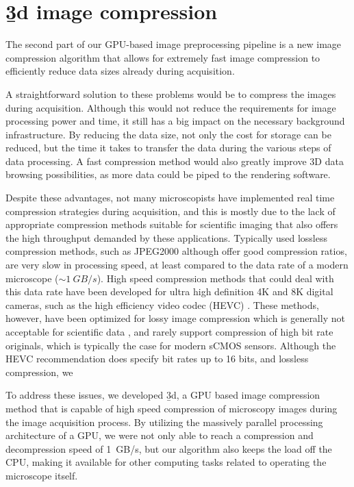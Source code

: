   
\section{\b3d image compression}

  The second part of our GPU-based image preprocessing pipeline is a new image compression algorithm that allows for extremely fast image compression to efficiently reduce data sizes already during acquisition.
  
  

  A straightforward solution to these problems would be to compress the images during acquisition. Although this would not reduce the requirements for image processing power and time, it still has a big impact on the necessary background infrastructure. By reducing the data size, not only the cost for storage can be reduced, but the time it takes to transfer the data during the various steps of data processing. A fast compression method would also greatly improve 3D data browsing possibilities, as more data could be piped to the rendering software.

  Despite these advantages, not many microscopists have implemented real time compression strategies during acquisition, and this is mostly due to the lack of appropriate compression methods suitable for scientific imaging that also offers the high throughput demanded by these applications. Typically used lossless compression methods, such as JPEG2000 \cite{adams_jpeg-2000_2001} although offer good compression ratios, are very slow in processing speed, at least compared to the data rate of a modern microscope ($\sim \SI{1}{GB/s}$). High speed compression methods that could deal with this data rate have been developed for ultra high definition 4K and 8K digital cameras, such as the high efficiency video codec (HEVC) \cite{international_telecommunications_union_h.265_2016}. These methods, however, have been optimized for lossy image compression which is generally not acceptable for scientific data \cite{cromey_digital_2013}, and rarely support compression of high bit rate originals, which is typically the case for modern sCMOS sensors. Although the HEVC recommendation does specify bit rates up to 16 bits, and lossless compression, we

  To address these issues, we developed \b3d, a GPU based image compression method that is capable of high speed compression of microscopy images during the image acquisition process. By utilizing the massively parallel processing architecture of a GPU, we were not only able to reach a compression and decompression speed of \SI{1}{GB/s}, but our algorithm also keeps the load off the CPU, making it available for other computing tasks related to operating the microscope itself.

